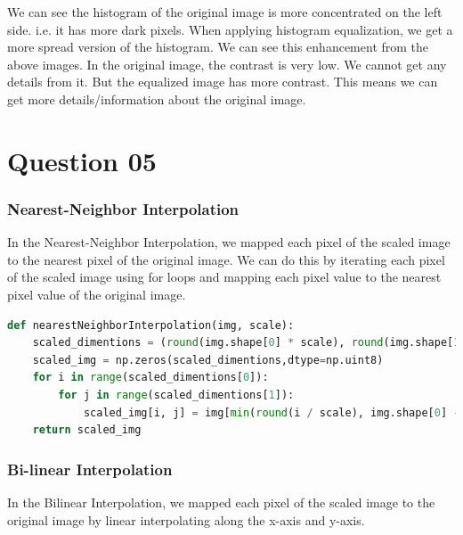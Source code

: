 \documentclass[a4paper]{article}
\begin{document}
We can see the histogram of the original image is more concentrated on the left side. i.e. it has more dark pixels. When applying histogram equalization, we get a more spread version of the histogram. We can see this enhancement from the above images. In the original image, the contrast is very low. We cannot get any details from it. But the equalized image has more contrast. This means we can get more details/information about the original image.

\section*{Question 05}
\subsubsection*{Nearest-Neighbor Interpolation}
In the Nearest-Neighbor Interpolation, we mapped each pixel of the
 scaled image to the nearest pixel of the original image. We can do
  this by iterating each pixel of the scaled image using for loops
   and mapping each pixel value to the nearest pixel value of the original
    image.
\begin{lstlisting}[language=python, caption=Nearest-Neighbor Interpolation]
def nearestNeighborInterpolation(img, scale):
    scaled_dimentions = (round(img.shape[0] * scale), round(img.shape[1] * scale), img.shape[2])
    scaled_img = np.zeros(scaled_dimentions,dtype=np.uint8)
    for i in range(scaled_dimentions[0]):
        for j in range(scaled_dimentions[1]):
            scaled_img[i, j] = img[min(round(i / scale), img.shape[0] - 1), min(round(j / scale), img.shape[1] - 1)]
    return scaled_img
\end{lstlisting}
\subsubsection*{Bi-linear Interpolation}
In the Bilinear Interpolation, we mapped each pixel of the scaled
 image to the original image by linear interpolating along the
  x-axis and y-axis.
\end{document}
